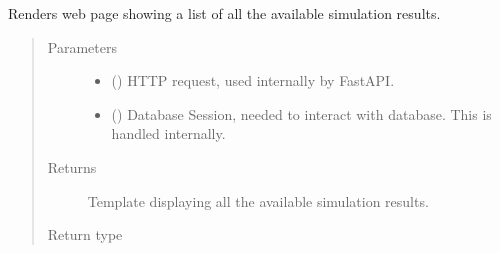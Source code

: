\documentclass[a4paper,landscape,10pt,english]{sphinxmanual}
\begin{document}
\begin{fulllineitems}
\label{\detokenize{code_docs/simulation_api.controller:simulation_api.controller.main.results}}
Renders web page showing a list of all the available simulation results.
\begin{quote}\begin{description}
\item[{Parameters}] \leavevmode\begin{itemize}
\item {} 
 () \textendash{} HTTP request, used internally by FastAPI.

\item {} 
 () \textendash{} Database Session, needed to interact with database. This is handled
internally.

\end{itemize}

\item[{Returns}] \leavevmode
Template displaying all the available simulation results.

\item[{Return type}] \leavevmode
{}

\end{description}\end{quote}

\end{fulllineitems}

\end{document}
